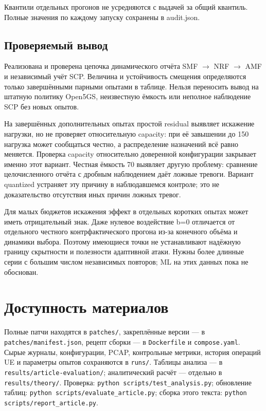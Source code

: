 \documentclass[11pt,a4paper]{article}
\begin{document}
Квантили отдельных прогонов не усредняются с выдачей за общий квантиль. Полные значения по каждому запуску сохранены в audit.json.

\subsection*{Проверяемый вывод}

Реализована и проверена цепочка динамического отчёта SMF \ensuremath{\to} NRF \ensuremath{\to} AMF и независимый учёт SCP. Величина и устойчивость смещения определяются только завершёнными парными опытами в таблице. Нельзя переносить вывод на штатную политику Open5GS, неизвестную ёмкость или неполное наблюдение SCP без новых опытов.

На завершённых дополнительных опытах простой residual выявляет искажение нагрузки, но не проверяет относительную capacity: при её завышении до 150 нагрузка может сообщаться честно, а распределение назначений всё равно меняется. Проверка capacity относительно доверенной конфигурации закрывает именно этот вариант. Честная ёмкость 70 выявляет другую проблему: сравнение целочисленного отчёта с дробным наблюдением даёт ложные тревоги. Вариант quantized устраняет эту причину в наблюдавшемся контроле; это не доказательство отсутствия иных причин ложных тревог.

Для малых бюджетов искажения эффект в отдельных коротких опытах может иметь отрицательный знак. Даже нулевое воздействие b=0 отличается от отдельного честного контрфактического прогона из-за конечного объёма и динамики выбора. Поэтому имеющиеся точки не устанавливают надёжную границу скрытности и полезности адаптивной атаки. Нужны более длинные серии с большим числом независимых повторов; ML на этих данных пока не обоснован.

\section*{Доступность материалов}

Полные патчи находятся в \texttt{patches/}, закреплённые версии — в \texttt{patches/manifest.json}, рецепт сборки — в \texttt{Dockerfile} и \texttt{compose.yaml}. Сырые журналы, конфигурации, PCAP, контрольные метрики, история операций UE и параметры опытов сохраняются в \texttt{runs/}. Таблицы анализа — в \texttt{results/article-evaluation/}; аналитический расчёт — отдельно в \texttt{results/theory/}. Проверка: \texttt{python scripts/test\_analysis.py}; обновление таблиц: \texttt{python scripts/evaluate\_article.py}; сборка этого текста: \texttt{python scripts/report\_article.py}.
\end{document}
